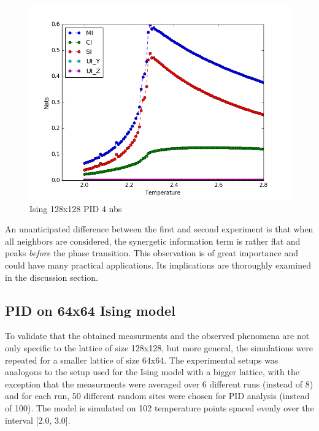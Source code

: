 \documentclass[12pt]{article}
\begin{document}
\begin{figure} [h!]
\begin{center}
\includegraphics[width=\textwidth]{ising-128-pid-4-nbs}
\caption{Ising 128x128 PID 4 nbs}
\label{fig:ising-128-pid-4-nbs}
\end{center}
\end{figure}

An unanticipated difference between the first and second experiment is that when all neighbors are considered, the synergetic information term is rather flat and peaks \textit{before} the phase transition. This observation is of great importance and could have many practical applications. Its implications are thoroughly examined in the discussion section. 

\subsection{PID on 64x64 Ising model}

To validate that the obtained measurments and the observed phenomena are not only specific to the lattice of size 128x128, but more general, the simulations were repeated for a smaller lattice of size 64x64. The experimental setups was analogous to the setup used for the Ising model with a bigger lattice, with the exception that the measurments were averaged over 6 different runs (instead of 8) and for each run, 50 different random sites were chosen for PID analysis (instead of 100). The model is simulated on 102 temperature points spaced evenly over the interval [2.0, 3.0]. 
\end{document}
